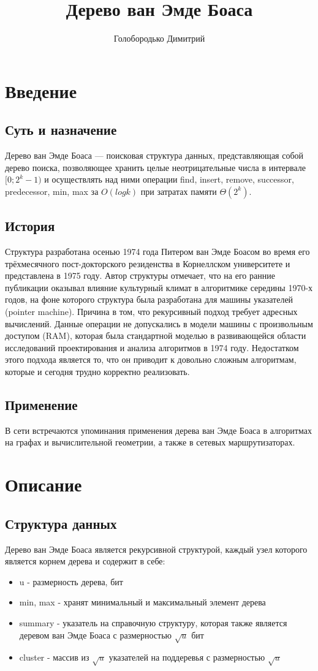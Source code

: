 \documentclass{article}
\title{Дерево ван Эмде Боаса}
\author{Голобородько Димитрий}
\begin{document}
\maketitle


\section{Введение}
\subsection{Суть и назначение}
Дерево ван Эмде Боаса — поисковая структура данных, представляющая собой дерево поиска, позволяющее хранить целые неотрицательные числа в интервале $[0;2^k-1)$ и осуществлять над ними операции find, insert, remove, successor, predecessor, min, max за $O(log{k})$ при затратах памяти $\Theta(2^k)$.
\subsection{История}
Структура разработана осенью 1974 года Питером ван Эмде Боасом во время его трёхмесячного пост-докторского резиденства в Корнеллском университете и представлена в 1975 году. Автор структуры отмечает, что на его ранние публикации оказывал влияние культурный климат в алгоритмике середины 1970-х годов, на фоне которого структура была разработана для машины указателей (pointer machine). Причина в том, что рекурсивный подход требует адресных вычислений. Данные операции не допускались в модели машины с произвольным доступом (RAM), которая была стандартной моделью в развивающейся области исследований проектирования и анализа алгоритмов в 1974 году. Недостатком этого подхода является то, что он приводит к довольно сложным алгоритмам, которые и сегодня трудно корректно реализовать. 
\subsection{Применение}
В сети встречаются упоминания применения дерева ван Эмде Боаса в алгоритмах на графах и вычислительной геометрии, а также в сетевых маршрутизаторах.
\section{Описание}
\subsection{Структура данных}
Дерево ван Эмде Боаса является рекурсивной структурой, каждый узел которого является корнем дерева и содержит в себе:
\begin{itemize}
    \item u - размерность дерева, бит
    \item min, max - хранят минимальный и максимальный элемент дерева
    \item summary - указатель на справочную структуру, которая также является деревом ван Эмде Боаса с размерностью $\sqrt{u}$ бит
    \item cluster - массив из $\sqrt{u}$ указателей на поддеревья с размерностью $\sqrt{u}$
\end{itemize}
\end{document}
